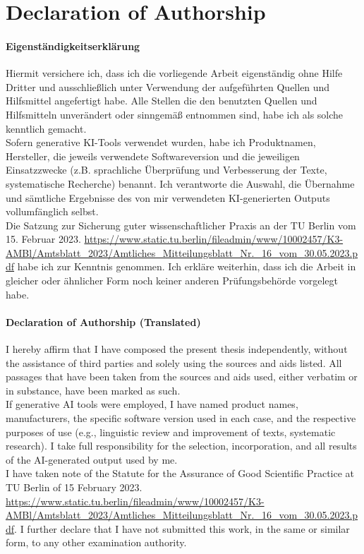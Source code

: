 \chapter*{Declaration of Authorship}
\thispagestyle{empty}
\subsubsection{Eigenständigkeitserklärung}
Hiermit versichere ich, dass ich die vorliegende Arbeit eigenständig ohne Hilfe Dritter und ausschließlich unter
Verwendung der aufgeführten Quellen und Hilfsmittel angefertigt habe. Alle Stellen die den benutzten Quellen
und Hilfsmitteln unverändert oder sinngemäß entnommen sind, habe ich als solche kenntlich gemacht.\\
Sofern generative KI-Tools verwendet wurden, habe ich Produktnamen, Hersteller, die jeweils verwendete
Softwareversion und die jeweiligen Einsatzzwecke (z.B. sprachliche Überprüfung und Verbesserung der Texte,
systematische Recherche) benannt. Ich verantworte die Auswahl, die Übernahme und sämtliche Ergebnisse
des von mir verwendeten KI-generierten Outputs vollumfänglich selbst.\\
Die Satzung zur Sicherung guter wissenschaftlicher Praxis an der TU Berlin vom 15. Februar 2023. \url{https://www.static.tu.berlin/fileadmin/www/10002457/K3-AMBl/Amtsblatt_2023/Amtliches_Mitteilungsblatt_Nr._16_vom_30.05.2023.pdf} habe ich zur Kenntnis genommen. Ich erkläre weiterhin, dass ich die Arbeit in gleicher oder ähnlicher Form noch keiner anderen Prüfungsbehörde
vorgelegt habe.

\subsubsection{Declaration of Authorship (Translated)}
I hereby affirm that I have composed the present thesis independently, without the assistance of third parties and solely using the sources and aids listed. All passages that have been taken from the sources and aids used, either verbatim or in substance, have been marked as such.\\
If generative AI tools were employed, I have named product names, manufacturers, the specific software version used in each case, and the respective purposes of use (e.g., linguistic review and improvement of texts, systematic research). I take full responsibility for the selection, incorporation, and all results of the AI-generated output used by me.\\
I have taken note of the Statute for the Assurance of Good Scientific Practice at TU Berlin of 15 February 2023. \url{https://www.static.tu.berlin/fileadmin/www/10002457/K3-AMBl/Amtsblatt_2023/Amtliches_Mitteilungsblatt_Nr._16_vom_30.05.2023.pdf}. I further declare that I have not submitted this work, in the same or similar form, to any other examination authority.


